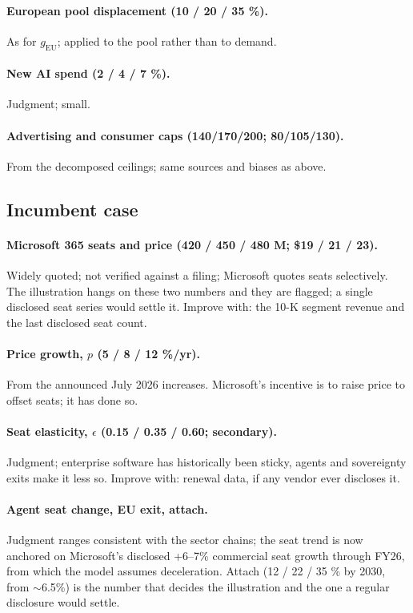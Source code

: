 \documentclass[11pt,letterpaper]{article}
\begin{document}
\paragraph{European pool displacement (10 / 20 / 35 \%).} As for $g_{\text{EU}}$; applied to the pool rather than to demand.

\paragraph{New AI spend (2 / 4 / 7 \%).} Judgment; small.

\paragraph{Advertising and consumer caps (140/170/200; 80/105/130).} From the decomposed ceilings; same sources and biases as above.

\subsection*{Incumbent case}

\paragraph{Microsoft 365 seats and price (420 / 450 / 480 M; \$19 / 21 / 23).} Widely quoted; not verified against a filing; Microsoft quotes seats selectively. The illustration hangs on these two numbers and they are flagged; a single disclosed seat series would settle it. Improve with: the 10-K segment revenue and the last disclosed seat count.

\paragraph{Price growth, $p$ (5 / 8 / 12 \%/yr).} From the announced July 2026 increases. Microsoft's incentive is to raise price to offset seats; it has done so.

\paragraph{Seat elasticity, $\epsilon$ (0.15 / 0.35 / 0.60; secondary).} Judgment; enterprise software has historically been sticky, agents and sovereignty exits make it less so. Improve with: renewal data, if any vendor ever discloses it.

\paragraph{Agent seat change, EU exit, attach.} Judgment ranges consistent with the sector chains; the seat trend is now anchored on Microsoft's disclosed +6--7\% commercial seat growth through FY26, from which the model assumes deceleration. Attach (12 / 22 / 35 \% by 2030, from $\sim$6.5\%) is the number that decides the illustration and the one a regular disclosure would settle.
\end{document}
